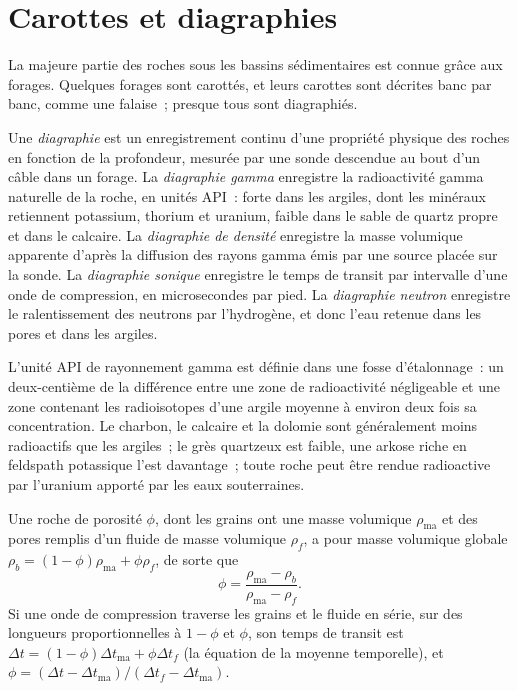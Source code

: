 \section{Carottes et diagraphies}\label{sec:b3:facies-models:logs}

La majeure partie des roches sous les bassins sédimentaires est connue grâce aux forages. Quelques
forages sont carottés, et leurs carottes sont décrites banc par banc, comme une falaise~; presque
tous sont diagraphiés.

\begin{definition}[Diagraphies]\label{def:b3:facies-models:wireline}
Une \emph{diagraphie} est un enregistrement continu d'une
propriété physique des roches en fonction de la profondeur, mesurée par une sonde descendue
au bout d'un câble dans un forage. La \emph{diagraphie gamma}
enregistre la radioactivité gamma naturelle de la roche, en unités API~: forte dans les argiles,
dont les minéraux retiennent potassium, thorium et uranium, faible dans le sable de quartz
propre et dans le calcaire. La \emph{diagraphie de densité}
enregistre la masse volumique apparente d'après la diffusion des rayons gamma émis par une
source placée sur la sonde. La \emph{diagraphie sonique} enregistre le
temps de transit par intervalle d'une onde de compression, en microsecondes par pied. La
\emph{diagraphie neutron} enregistre le ralentissement des neutrons par
l'hydrogène, et donc l'eau retenue dans les pores et dans les argiles.
\end{definition}

L'unité API de rayonnement gamma est définie dans une fosse d'étalonnage~: un deux-centième de
la différence entre une zone de radioactivité négligeable et une zone contenant
les radioisotopes d'une argile moyenne à environ deux fois sa concentration. Le charbon,
le calcaire et la dolomie sont généralement moins radioactifs que les argiles~; le grès
quartzeux est faible, une arkose riche en feldspath potassique l'est davantage~; toute roche peut être
rendue radioactive par l'uranium apporté par les eaux souterraines.

\begin{proposition}\label{prop:b3:facies-models:porosity}
Une roche de porosité $\phi$, dont les grains ont une masse volumique $\rho_{\mathrm{ma}}$ et
des pores remplis d'un fluide de masse volumique $\rho_f$, a pour masse volumique globale
$\rho_b = (1 - \phi)\rho_{\mathrm{ma}} + \phi\rho_f$, de sorte que
\[
\phi = \frac{\rho_{\mathrm{ma}} - \rho_b}{\rho_{\mathrm{ma}} - \rho_f}.
\]
Si une onde de compression traverse les grains et le fluide en série, sur des
longueurs proportionnelles à $1 - \phi$ et $\phi$, son temps de transit est
$\Delta t = (1 - \phi)\Delta t_{\mathrm{ma}} + \phi\Delta t_f$ (la
équation de la moyenne temporelle), et $\phi = (\Delta t - \Delta
t_{\mathrm{ma}})/(\Delta t_f - \Delta t_{\mathrm{ma}})$.
\end{proposition}

